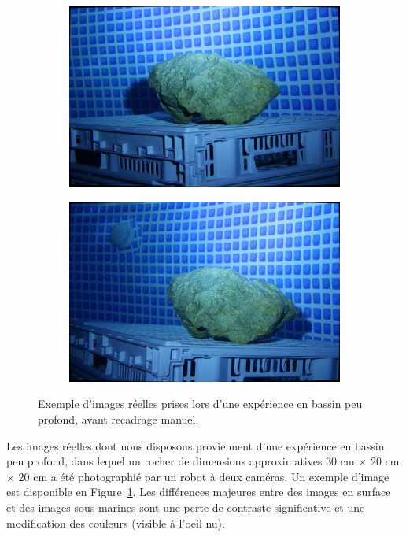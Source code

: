 \documentclass[
	a4paper, %
	10pt, %
	unnumberedsections, %
	twoside, %
]{LTJournalArticle}
\begin{document}
\begin{figure}[H]
	\centering
	\begin{subfigure}[H]{\columnwidth}
		\centering
		\includegraphics[width=\textwidth]{images/scene_l_1_u.jpeg}
	\end{subfigure}
	\begin{subfigure}[H]{\columnwidth}
		\centering
		\includegraphics[width=\textwidth]{images/scene_r_1_u.jpeg}
	\end{subfigure}
	\caption{Exemple d'images réelles prises lors d'une expérience en bassin peu profond, avant recadrage manuel.}
	\label{figure:irl_example}
\end{figure}

Les images réelles dont nous disposons proviennent d'une expérience en bassin peu profond, dans lequel un rocher de dimensions approximatives $30$ cm $\times$ $20$ cm $\times$ $20$ cm a été photographié par un robot à deux caméras. Un exemple d'image est disponible en Figure~\ref{figure:irl_example}.
Les différences majeures entre des images en surface et des images sous-marines sont une perte de contraste significative et une modification des couleurs (visible à l'oeil nu).
\end{document}
